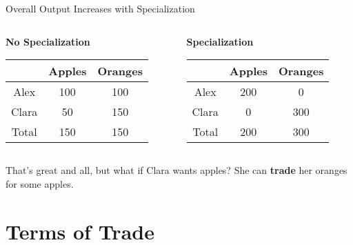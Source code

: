 \documentclass{beamer}
\begin{document}
\begin{frame}{Overall Output Increases with Specialization}

\begin{exampleblock}

\begin{columns}[T] %
\begin{column}{.48\textwidth}

\begin{center}
\textbf{No Specialization}

\begin{tabular}{| c | c c |}\hline
 & Apples & Oranges \\\hline
Alex & 100 & 100 \\
Clara & 50 & 150 \\\hline
Total & 150 & 150 \\\hline
\end{tabular}

\end{center}
\end{column}%
\hfill%
\begin{column}{.48\textwidth}


\begin{center}

\textbf{Specialization}

\begin{tabular}{ | c | c c |}\hline
 & Apples & Oranges \\\hline
Alex & 200 & 0 \\
Clara & 0 & 300 \\\hline
Total & 200 & 300 \\\hline
\end{tabular}

\end{center}

\end{column}%
\end{columns}

\end{exampleblock}

That's great and all, but what if Clara wants apples? She can \textbf{trade} her oranges for some apples.

\end{frame}

\section{Terms of Trade}
\end{document}
